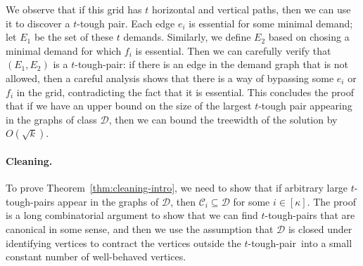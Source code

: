 \documentclass[a4paper,11pt]{article}
\newcommand{\calD}{\mathcal{D}}
\theoremstyle{plain}
\newtheorem{identification rule}{Identification Rule}
\theoremstyle{definition}
\theoremstyle{remark}
\newcommand{\toughpair}{tough-pair}
\begin{document}
We observe that if this grid has $t$ horizontal and vertical paths, then we can use it to discover a $t$-tough pair. Each edge $e_i$ is essential for some minimal demand; let $E_1$ be the set of these $t$ demands. Similarly, we define $E_2$ based on chosing a minimal demand for which $f_i$ is essential. Then we can carefully verify that $(E_1,E_2)$ is a $t$-\toughpair: if there is an edge in the demand graph that is not allowed, then a careful analysis shows that there is a way of bypassing some $e_i$ or $f_i$ in the grid, contradicting the fact that it is essential. This concludes the proof that if we have an upper bound on the size of the largest $t$-tough pair appearing in the graphs of class $\calD$, then we can bound the treewidth of the solution by $O(\sqrt{k})$.

 \paragraph{Cleaning.}
 To prove Theorem~\ref{thm:cleaning-intro}, we need to show that if arbitrary large $t$-tough-pairs appear in the graphs of $\calD$, then $\mathcal{C}_i\subseteq \calD$ for some $i\in[\kappa]$. The proof is a long combinatorial argument to show that we can find $t$-tough-pairs that are canonical in some sense, and then we use the assumption that $\calD$ is closed under identifying vertices to contract the vertices outside the $t$-\toughpair\ into a small constant number of well-behaved vertices.
\end{document}
